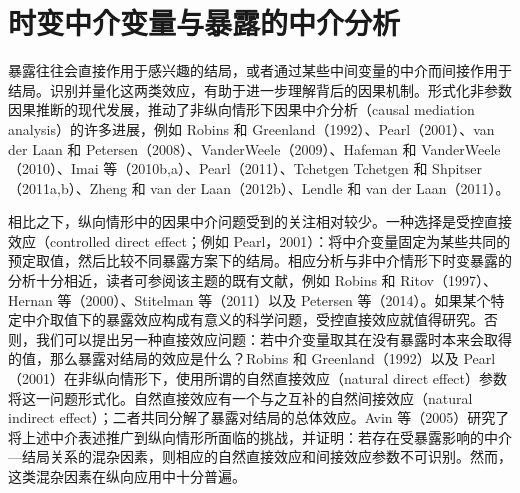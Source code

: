 \chapter{时变中介变量与暴露的中介分析}
\label{ch:time-varying-mediation}

暴露往往会直接作用于感兴趣的结局，或者通过某些中间变量的中介而间接作用于结局。识别并量化这两类效应，有助于进一步理解背后的因果机制。形式化非参数因果推断的现代发展，推动了非纵向情形下因果中介分析（causal mediation analysis）的许多进展，例如 Robins 和 Greenland（1992）、Pearl（2001）、van der Laan 和 Petersen（2008）、VanderWeele（2009）、Hafeman 和 VanderWeele（2010）、Imai 等（2010b,a）、Pearl（2011）、Tchetgen Tchetgen 和 Shpitser（2011a,b）、Zheng 和 van der Laan（2012b）、Lendle 和 van der Laan（2011）。

相比之下，纵向情形中的因果中介问题受到的关注相对较少。一种选择是受控直接效应（controlled direct effect；例如 Pearl，2001）：将中介变量固定为某些共同的预定取值，然后比较不同暴露方案下的结局。相应分析与非中介情形下时变暴露的分析十分相近，读者可参阅该主题的既有文献，例如 Robins 和 Ritov（1997）、Hernan 等（2000）、Stitelman 等（2011）以及 Petersen 等（2014）。如果某个特定中介取值下的暴露效应构成有意义的科学问题，受控直接效应就值得研究。否则，我们可以提出另一种直接效应问题：若中介变量取其在没有暴露时本来会取得的值，那么暴露对结局的效应是什么？Robins 和 Greenland（1992）以及 Pearl（2001）在非纵向情形下，使用所谓的自然直接效应（natural direct effect）参数将这一问题形式化。自然直接效应有一个与之互补的自然间接效应（natural indirect effect）；二者共同分解了暴露对结局的总体效应。Avin 等（2005）研究了将上述中介表述推广到纵向情形所面临的挑战，并证明：若存在受暴露影响的中介—结局关系的混杂因素，则相应的自然直接效应和间接效应参数不可识别。然而，这类混杂因素在纵向应用中十分普遍。

